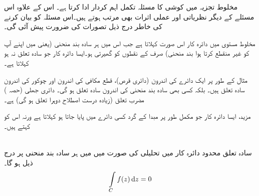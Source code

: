  مخلوط تجزیہ میں کوشی کا مسئلہ تکمل اہم کردار ادا کرتا ہے۔ اس کے علاوہ اس مسئلے کے  دیگر نظریاتی اور عملی اثرات بھی مرتب ہوتے ہیں۔اس مسئلہ کو بیان کرنے کی خاطر درج ذیل تصورات کی ضرورت پیش آئی گی۔

مخلوط مستوی میں دائرہ کار  اس صورت  کہلاتا ہے جب اس میں ہر سادہ بند منحنی (یعنی  میں  اپنے آپ کو غیر منقطع کرتا ہوا بند منحنی)  صرف  کے نقطوں کو گھیرتی ہو۔ایسا دائرہ کار جو سادہ تعلق  نہ ہو  کہلاتا ہے۔

مثال کے طور پر ایک دائرے کی اندرون (دائری قرص)، قطع مکافی کی اندرون اور چوکور کی اندرون سادہ تعلق ہیں۔ بلکہ کسی بھی سادہ بند منحنی کی اندرون سادہ تعلق ہو گی۔ دائری جھلی  (حصہ ) مضرب تعلق (زیادہ درست اصطلاح دوہرا تعلق ہو گی) ہے۔

مزید، ایسا دائرہ کار  جو مکمل طور پر مبدا کے گرد کسی دائرے میں پایا جاتا ہو  کہلاتا ہے ورنہ  اس  کو  کہتے ہیں۔

\quad {}\\
سادہ تعلق محدود دائرہ کار  میں تحلیلی  کی صورت میں  میں ہر سادہ  بند منحنی  پر درج ذیل ہو گا۔
\begin{align}\label{مساوات_مخلوط_تکمل_مسئلہ_کوشی_تکمل}
\int\limits_C f(z)\dif z=0
\end{align}

